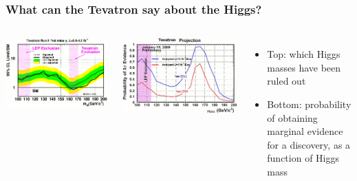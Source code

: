 \documentclass[compress]{beamer}
\begin{document}
\begin{frame}
\frametitle{What can the Tevatron say about the Higgs?}

\begin{columns}
\includegraphics[width=\linewidth]{fermilab_higgs_exclusion.png}

\vspace{0.2 cm}
\includegraphics[width=\linewidth]{probability_higgs_fermilab.png}

\begin{itemize}
\item Top: which Higgs masses have been ruled out

\vspace{3 cm}
\item Bottom: probability of obtaining marginal evidence for a discovery, as a
  function of Higgs mass
\end{itemize}
\end{columns}
\end{frame}
\end{document}

